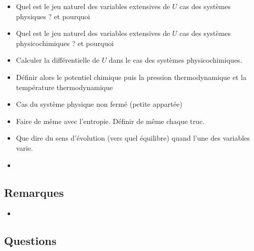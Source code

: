 \documentclass[a4paper, 11pt, hidelinks]{article}
\begin{document}
\begin{itemize}
    \item Quel est le jeu naturel des variables extensives de $U$ cas des systèmes physiques ? et pourquoi \cite{Chapitre1bis}
    \item Quel est le jeu naturel des variables extensives de $U$ cas des systèmes physicochimiques ? et pourquoi \cite{Chapitre1bis}
    \item Calculer la différentielle de $U$ dans le cas des systèmes physicochimiques. \cite{Chapitre1bis}
    \item Définir alors le potentiel chimique puis la pression thermodynamique et la température thermodynamique \cite{Chapitre1bis}
    \item Cas du système physique non fermé (petite appartée) \cite{Chapitre1bis}
    \item Faire de même avec l'entropie. Définir de même chaque truc. \cite{Chapitre1bis}
    \item Que dire du sens d'évolution (vers quel équilibre) quand l'une des variables varie. \cite{Chapitre1bis}
    \item 
\end{itemize}


\subsection{Remarques}



\begin{itemize}
    \item 
\end{itemize}









\subsection{Questions}
\end{document}
